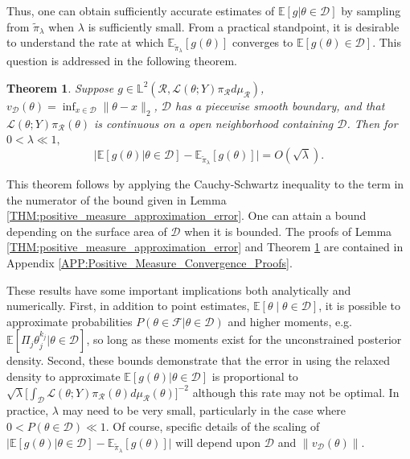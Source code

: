 \documentclass[10pt,fleqn]{article}
\newtheorem{theorem}{Theorem} \newtheorem{lemma}{Lemma}
\newcommand{\bb}[1]{\mathbb{#1}} \newcommand{\mc}[1]{\mathcal{#1}}
\DeclareMathOperator{\1}{\mathbbm{1}} \DeclareMathOperator{\bigO}{\mc O}
\begin{document}
Thus, one can obtain sufficiently accurate estimates of
$\bb E[g|\theta\in\mathcal{D}]$ by sampling from $\tilde{\pi}_\lambda$ when
$\lambda$ is sufficiently small.  From a practical standpoint, it is
desirable to understand the rate at which
$\bb E_{\tilde{\pi}_\lambda}[g(\theta)] $ converges to
$\bb E[g(\theta)\in\mathcal{D}]$. This question is addressed in the following
theorem.

\begin{theorem} \label{THM:Positive_measure_convergence_rate} Suppose $g
\in  \mathbb{L}^2(\mathcal{R},
\mathcal{L}(\theta;Y)\pi_\mathcal{R}d\mu_\mathcal{R})$,
$v_{\mc D}(\theta)= \inf_{x\in\mathcal{D}} \|\theta-x\|_2$, $\mathcal{D}$ has a piecewise smooth boundary, and that
$\mathcal{L}(\theta;Y)\pi_\mathcal{R}(\theta)$ is continuous on a
open neighborhood containing $\mathcal{D}$.  Then for $0<\lambda
\ll 1,$ $$ \bigg|\bb E[g(\theta) |\theta\in\mathcal{D}] -
\bb E_{\tilde{\pi}_\lambda}[g(\theta)]   \bigg| = O(\sqrt{\lambda}).  $$
\end{theorem} This theorem follows by applying the Cauchy-Schwartz
inequality to the term in the numerator of the bound given in Lemma
\ref{THM:positive_measure_approximation_error}.  One can attain a bound
depending on the surface area of $\mathcal{D}$ when it is bounded. The proofs of
Lemma \ref{THM:positive_measure_approximation_error} and Theorem
\ref{THM:Positive_measure_convergence_rate} are contained in Appendix
\ref{APP:Positive_Measure_Convergence_Proofs}.

These results have some important implications both analytically and
numerically.  First, in addition to point estimates,
$\bb E[\theta \mid \theta\in\mathcal{D}]$, it is possible to approximate
probabilities $P(\theta \in \mathcal{F}|\theta \in \mathcal{D})$ and higher
moments, e.g. $\bb E[\Pi_j \theta_j^{k_j} |\theta\in\mathcal{D}]$, so long as
these moments exist for the unconstrained posterior density. Second, these bounds demonstrate that the error in using the relaxed
density to approximate $\bb E[g(\theta)|\theta\in\mathcal{D}]$ is proportional
to $\sqrt{\lambda} [\int_\mathcal{D}\mathcal{L}(\theta; Y)
\pi_\mathcal{R}(\theta)d\mu_\mathcal{R}(\theta)\big]^{-2}$ although this
rate may not be optimal.  In practice, $\lambda$ may need to be very small,
particularly in the case where $0<P(\theta\in\mathcal{D})\ll 1.$ Of course,
specific details of the scaling of $\bigg|\bb E[g(\theta)
|\theta\in\mathcal{D}] - \bb E_{\tilde{\pi}_\lambda}[g(\theta)]   \bigg|$ will
depend upon $\mathcal{D}$ and $\|v_{\mc D}(\theta)\|$.
\end{document}
